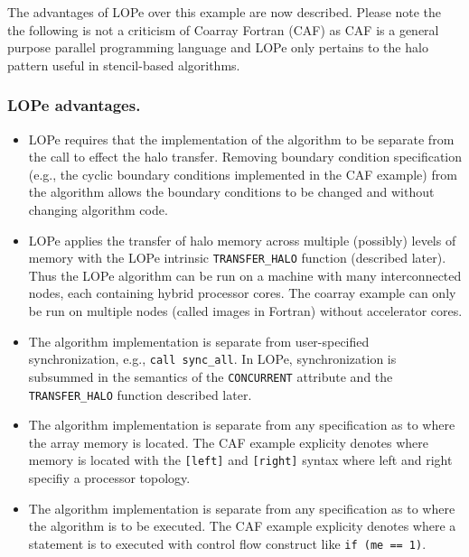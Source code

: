 The advantages of LOPe over this example are now described.  Please note the the following
is not a criticism of Coarray Fortran (CAF) as CAF is a general purpose parallel programming
language and LOPe only pertains to the halo pattern useful in stencil-based algorithms.

\subsubsection{LOPe advantages.}
\begin{itemize}

\item
LOPe requires that the implementation of the algorithm to be separate from the call to
effect the halo transfer.  Removing boundary condition specification (e.g., the cyclic
boundary conditions implemented in the CAF example) from the algorithm allows the boundary
conditions to be changed and without changing algorithm code.

\item
LOPe applies the transfer of halo memory across multiple (possibly) levels of memory with
the LOPe intrinsic \texttt{TRANSFER\_HALO} function (described later).  Thus the LOPe
algorithm can be run on a machine with many interconnected nodes, each containing hybrid
processor cores.  The coarray example can only be run on multiple nodes (called images in
Fortran) without accelerator cores.

\item
The algorithm implementation is separate from user-specified synchronization, e.g.,
\texttt{call sync\_all}.  In LOPe, synchronization is subsummed in the semantics of the
\texttt{CONCURRENT} attribute and the \texttt{TRANSFER\_HALO} function described later.

\item
The algorithm implementation is separate from any specification as to where the array
memory is located.  The CAF example explicity denotes where memory is located with the
\texttt{[left]} and \texttt{[right]} syntax where left and right specifiy a processor
topology.

\item
The algorithm implementation is separate from any specification as to where the algorithm
is to be executed.  The CAF example explicity denotes where a statement is to executed
with control flow construct like \texttt{if (me == 1)}.


\end{itemize}
